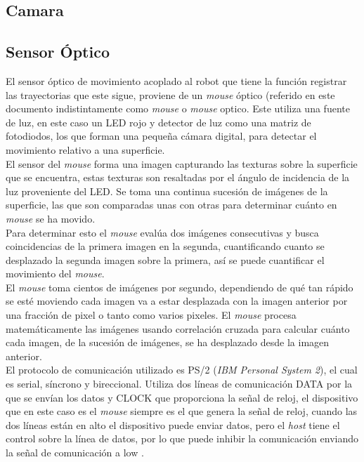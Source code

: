 \documentclass{iccmemoria}
\begin{document}
\subsection{Camara}

\subsection{Sensor Óptico}

El sensor óptico de movimiento acoplado al robot que tiene la función registrar las trayectorias que este sigue, proviene de un \emph{mouse} óptico (referido en este documento indistintamente como \emph{mouse} o \emph{mouse} optico. Este utiliza una fuente de luz, en este caso un LED rojo y detector de luz como una matriz de fotodiodos, los que forman una pequeña cámara digital, para detectar el movimiento relativo a una superficie.\\

El sensor del \emph{mouse} forma una imagen capturando las texturas sobre la superficie que se encuentra, estas texturas son resaltadas por el ángulo de incidencia de la luz proveniente del LED. Se toma una continua sucesión de imágenes de la superficie, las que son comparadas unas con otras para determinar cuánto en \emph{mouse} se ha movido.\\

Para determinar esto el \emph{mouse} evalúa dos imágenes consecutivas y busca coincidencias de la primera imagen en la segunda, cuantificando cuanto se desplazado la segunda imagen sobre la primera, así se puede cuantificar el movimiento del \emph{mouse}.\\

El \emph{mouse} toma cientos de imágenes por segundo, dependiendo de qué tan rápido se esté moviendo cada imagen va a estar desplazada con la imagen anterior por una fracción de pixel o tanto como varios pixeles. El \emph{mouse} procesa matemáticamente las imágenes usando correlación cruzada para calcular cuánto cada imagen, de la sucesión de imágenes, se ha desplazado desde la imagen anterior.\\

El protocolo de comunicación utilizado es PS/2 (\emph{IBM Personal System 2}), el cual es serial, síncrono y bireccional. Utiliza dos líneas de comunicación DATA por la que se envían los datos y CLOCK que proporciona la señal de reloj, el dispositivo que en este caso es el \emph{mouse} siempre es el que genera la señal de reloj, cuando las dos líneas están en alto el dispositivo puede enviar datos, pero el \emph{host} tiene el control sobre la línea de datos, por lo que puede inhibir la comunicación enviando la señal de comunicación a low \cite{ps2protocol}.\\
\end{document}
